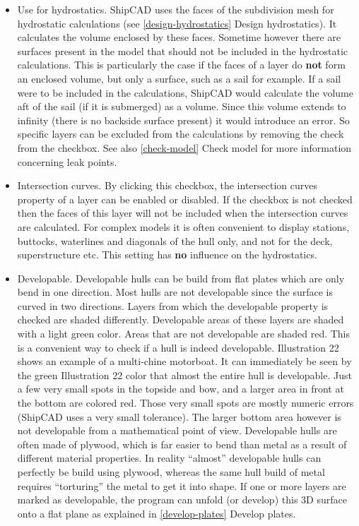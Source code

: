 \documentclass[12pt]{article}
\begin{document}
\begin{itemize}
\item Use for hydrostatics.
ShipCAD uses the faces of the subdivision mesh for hydrostatic
calculations (see \ref{design-hydrostatics} Design hydrostatics). It
calculates the volume enclosed by these faces. Sometime however there
are surfaces present in the model that should not be included in the
hydrostatic calculations. This is particularly the case if the faces
of a layer do \textbf{not} form an enclosed volume, but only a
surface, such as a sail for example. If a sail were to be included in
the calculations, ShipCAD would calculate the volume aft of the sail
(if it is submerged) as a volume. Since this volume extends to
infinity (there is no backside surface present) it would introduce an
error. So specific layers can be excluded from the calculations by
removing the check from the checkbox. See also \ref{check-model} Check
model for more information concerning leak points.

\item Intersection curves.
By clicking this checkbox, the intersection curves property of a layer
can be enabled or disabled. If the checkbox is not checked then the
faces of this layer will not be included when the intersection curves
are calculated. For complex models it is often convenient to display
stations, buttocks, waterlines and diagonals of the hull only, and not
for the deck, superstructure etc. This setting has \textbf{no} influence on the
hydrostatics.

\item Developable.
Developable hulls can be build from flat plates which are only bend in
one direction. Most hulls are not developable since the surface is
curved in two directions.  Layers from which the developable property
is checked are shaded differently. Developable areas of these layers
are shaded with a light green color. Areas that are not developable
are shaded red. This is a convenient way to check if a hull is indeed
developable.  Illustration 22 shows an example of a multi-chine
motorboat. It can immediately be seen by the green Illustration 22
color that almost the entire hull is developable. Just a few very
small spots in the topside and bow, and a larger area in front at the
bottom are colored red. Those very small spots are mostly numeric
errors (ShipCAD uses a very small tolerance). The larger bottom area
however is not developable from a mathematical point of
view. Developable hulls are often made of plywood, which is far easier
to bend than metal as a result of different material properties. In
reality “almost” developable hulls can perfectly be build using
plywood, whereas the same hull build of metal requires “torturing” the
metal to get it into shape. If one or more layers are marked as
developable, the program can unfold (or develop) this 3D surface onto
a flat plane as explained in \ref{develop-plates} Develop plates.


\end{itemize}
\end{document}
